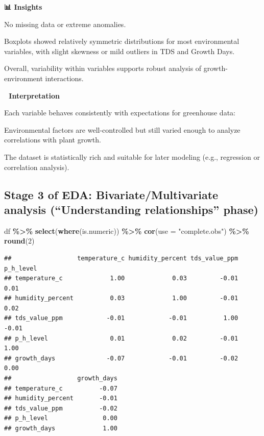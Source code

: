 \documentclass[
]{article}
\newenvironment{Shaded}{\begin{snugshade}}{\end{snugshade}}
\newcommand{\AttributeTok}[1]{\textcolor[rgb]{0.13,0.29,0.53}{#1}}
\newcommand{\DecValTok}[1]{\textcolor[rgb]{0.00,0.00,0.81}{#1}}
\newcommand{\FunctionTok}[1]{\textcolor[rgb]{0.13,0.29,0.53}{\textbf{#1}}}
\newcommand{\NormalTok}[1]{#1}
\newcommand{\SpecialCharTok}[1]{\textcolor[rgb]{0.81,0.36,0.00}{\textbf{#1}}}
\newcommand{\StringTok}[1]{\textcolor[rgb]{0.31,0.60,0.02}{#1}}
\begin{document}
\textbf{📊 Insights}

No missing data or extreme anomalies.

Boxplots showed relatively symmetric distributions for most
environmental variables, with slight skewness or mild outliers in TDS
and Growth Days.

Overall, variability within variables supports robust analysis of
growth-environment interactions.

\textbf{🧠 Interpretation}

Each variable behaves consistently with expectations for greenhouse
data:

Environmental factors are well-controlled but still varied enough to
analyze correlations with plant growth.

The dataset is statistically rich and suitable for later modeling (e.g.,
regression or correlation analysis).

\subsection{Stage 3 of EDA: Bivariate/Multivariate analysis
(``Understanding relationships''
phase)}\label{stage-3-of-eda-bivariatemultivariate-analysis-understanding-relationships-phase}

\begin{Shaded}
\begin{Highlighting}[]
\NormalTok{df }\SpecialCharTok{\%\textgreater{}\%} \FunctionTok{select}\NormalTok{(}\FunctionTok{where}\NormalTok{(is.numeric)) }\SpecialCharTok{\%\textgreater{}\%} 
  \FunctionTok{cor}\NormalTok{(}\AttributeTok{use =} \StringTok{"complete.obs"}\NormalTok{) }\SpecialCharTok{\%\textgreater{}\%} \FunctionTok{round}\NormalTok{(}\DecValTok{2}\NormalTok{)}
\end{Highlighting}
\end{Shaded}

\begin{verbatim}
##                  temperature_c humidity_percent tds_value_ppm p_h_level
## temperature_c             1.00             0.03         -0.01      0.01
## humidity_percent          0.03             1.00         -0.01      0.02
## tds_value_ppm            -0.01            -0.01          1.00     -0.01
## p_h_level                 0.01             0.02         -0.01      1.00
## growth_days              -0.07            -0.01         -0.02      0.00
##                  growth_days
## temperature_c          -0.07
## humidity_percent       -0.01
## tds_value_ppm          -0.02
## p_h_level               0.00
## growth_days             1.00
\end{verbatim}
\end{document}
